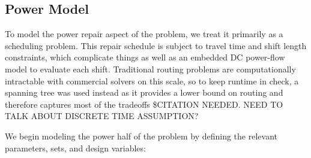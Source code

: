 \documentclass[10pt]{article}
\begin{document}
\subsection{Power Model}
\vspace*{-12pt}
To model the power repair aspect of the problem, we treat it primarily as a scheduling problem. This repair schedule is subject to travel time and shift length constraints, which complicate things as well as an embedded DC power-flow model to evaluate each shift. Traditional routing problems are computationally intractable with commercial solvers on this scale, so to keep runtime in check, a spanning tree was used instead as it provides a lower bound on routing and therefore captures most of the tradeoffs \$CITATION NEEDED. NEED TO TALK ABOUT DISCRETE TIME ASSUMPTION?

We begin modeling the power half of the problem by defining the relevant parameters, sets, and design variables:
\end{document}
